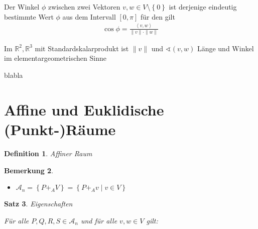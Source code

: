 \documentclass[%
a4paper,
11pt,		%
]
{scrartcl}
\newcommand{\R}{\mathbb{R}}
\theoremstyle{plain}
\newtheorem{mydef}{Definition}[section]
\theoremstyle{plain}
\newtheorem{mysatz}[mydef]{Satz}
\theoremstyle{plain}
\theoremstyle{plain}
\newtheorem{mybem}[mydef]{Bemerkung}
\theoremstyle{plain}
\begin{document}
Der Winkel $\phi$ zwischen zwei Vektoren $v,w \in V\setminus\left\{ 0 \right\}$ ist derjenige eindeutig bestimmte Wert $\phi$ aus dem Intervall $\left[ 0,\pi \right]$ für den gilt
\begin{align*}
    \cos \phi = \frac{\left\langle v,w \right\rangle}{\|v\| \cdot \|w\|}
\end{align*}

\newpage

Im $\R^2,\R^3$ mit Standardskalarprodukt ist $\| v \|$ und $\sphericalangle (v,w)$ Länge und Winkel im elementargeometrischen Sinne
\begin{center}
\end{center}
blabla


\newpage

\section{Affine und Euklidische (Punkt-)Räume} %
\label{sec:Affine und Euklidische (Punkt-)Räume}

\begin{mydef}
    Affiner Raum
\end{mydef}

\begin{mybem}
    \begin{itemize}
        \item $\mathcal{A}_n = \left\{ P +_A V \right\} = \left\{ P +_A v \mid v \in V \right\}$
    \end{itemize}
\end{mybem}

\begin{mysatz}
    Eigenschaften

    Für alle $P,Q,R,S \in \mathcal{A}_n$ und  für alle $v,w \in V$ gilt:
\end{mysatz}
\end{document}
